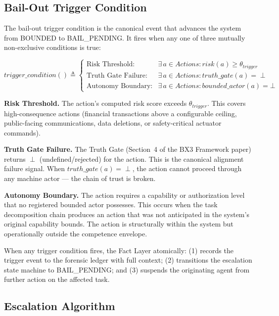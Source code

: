 \subsection{Bail-Out Trigger Condition}
\label{sec:trigger}

The bail-out trigger condition is the canonical event that advances the system from BOUNDED to BAIL\_PENDING. It fires when any one of three mutually non-exclusive conditions is true:

\begin{equation}
trigger\_condition() \triangleq
\begin{cases}
\text{Risk Threshold:} & \exists\, a \in Actions : risk(a) \geq \theta_{trigger} \\[4pt]
\text{Truth Gate Failure:} & \exists\, a \in Actions : truth\_gate(a) = \perp \\[4pt]
\text{Autonomy Boundary:} & \exists\, a \in Actions : bounded\_actor(a) = \bot
\end{cases}
\end{equation}

\medskip\noindent\textbf{Risk Threshold.} The action's computed risk score exceeds $\theta_{trigger}$. This covers high-consequence actions (financial transactions above a configurable ceiling, public-facing communications, data deletions, or safety-critical actuator commands).

\medskip\noindent\textbf{Truth Gate Failure.} The Truth Gate (Section~4 of the BX3 Framework paper) returns $\perp$ (undefined/rejected) for the action. This is the canonical alignment failure signal. When $truth\_gate(a) = \perp$, the action cannot proceed through any machine actor --- the chain of trust is broken.

\medskip\noindent\textbf{Autonomy Boundary.} The action requires a capability or authorization level that no registered bounded actor possesses. This occurs when the task decomposition chain produces an action that was not anticipated in the system's original capability bounds. The action is structurally within the system but operationally outside the competence envelope.

When any trigger condition fires, the Fact Layer atomically: (1) records the trigger event to the forensic ledger with full context; (2) transitions the escalation state machine to BAIL\_PENDING; and (3) suspends the originating agent from further action on the affected task.

\subsection{Escalation Algorithm}
\label{sec:escalation}

